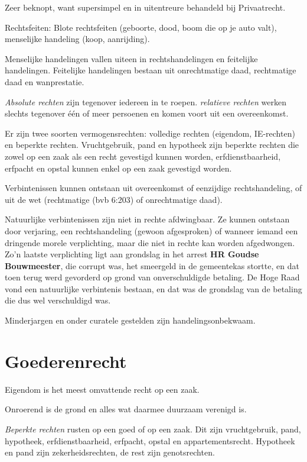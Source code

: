 \documentclass{article}
\begin{document}
Zeer beknopt, want supersimpel en in uitentreure behandeld bij Privaatrecht.

Rechtsfeiten: Blote rechtsfeiten (geboorte, dood, boom die op je auto valt),
menselijke handeling (koop, aanrijding).

Menselijke handelingen vallen uiteen in rechtshandelingen en feitelijke
handelingen. Feitelijke handelingen bestaan uit onrechtmatige daad, rechtmatige
daad en wanprestatie.

\emph{Absolute rechten} zijn tegenover iedereen in te roepen. \emph{relatieve
rechten} werken slechts tegenover \'e\'en of meer persoenen en komen voort uit
een overeenkomst.

Er zijn twee soorten vermogensrechten: volledige rechten (eigendom, IE-rechten)
en beperkte rechten. Vruchtgebruik, pand en hypotheek zijn beperkte rechten die
zowel op een zaak als een recht gevestigd kunnen worden, erfdienstbaarheid,
erfpacht en opstal kunnen enkel op een zaak gevestigd worden.

Verbintenissen kunnen ontstaan uit overeenkomst of eenzijdige rechtshandeling,
of uit de wet (rechtmatige (bvb 6:203) of onrechtmatige daad).

Natuurlijke verbintenissen zijn niet in rechte afdwingbaar. Ze kunnen ontstaan
door verjaring, een rechtshandeling (gewoon afgesproken) of wanneer iemand een
dringende morele verplichting, maar die niet in rechte kan worden afgedwongen.
Zo'n laatste verplichting ligt aan grondslag in het arrest \textbf{HR Goudse
Bouwmeester}, die corrupt was, het smeergeld in de gemeentekas stortte, en dat
toen terug werd gevorderd op grond van onverschuldigde betaling. De Hoge Raad
vond een natuurlijke verbintenis bestaan, en dat was de grondslag van de
betaling die dus wel verschuldigd was.

Minderjargen en onder curatele gestelden zijn handelingsonbekwaam.

\section{Goederenrecht}

Eigendom is het meest omvattende recht op een zaak.

Onroerend is de grond en alles wat daarmee duurzaam verenigd is.

\emph{Beperkte rechten} rusten op een goed of op een zaak. Dit zijn
vruchtgebruik, pand, hypotheek, erfdienstbaarheid, erfpacht, opstal en
appartementsrecht. Hypotheek en pand zijn zekerheidsrechten, de rest zijn
genotsrechten.
\end{document}
